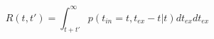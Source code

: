 \begin{equation}
R(t,t') = \int_{t+t'}^\infty p(t_{in}=t,t_{ex}-t|t) dt_{ex}   dt_{ex}
\end{equation}